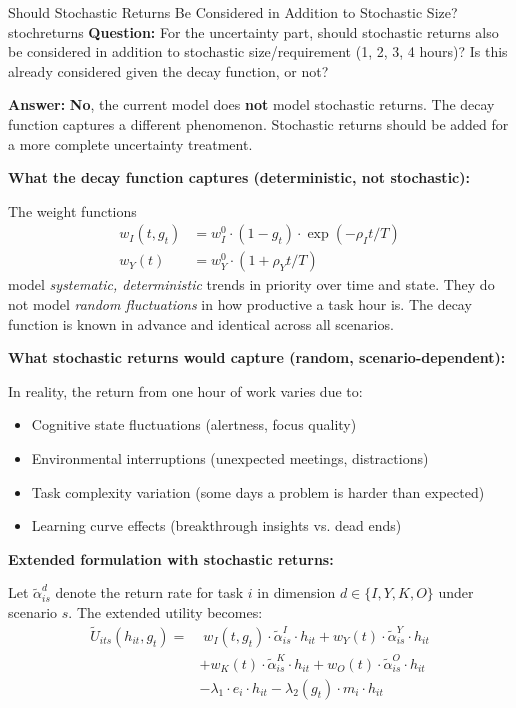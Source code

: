 \documentclass[11pt,a4paper]{article}
\begin{document}
\begin{questionbox}{Should Stochastic Returns Be Considered in Addition to Stochastic Size?}{stochreturns}
\textbf{Question:} For the uncertainty part, should stochastic returns also be considered in addition to stochastic size/requirement (1, 2, 3, 4 hours)? Is this already considered given the decay function, or not?

\textbf{Answer:} \textbf{No}, the current model does \textbf{not} model stochastic returns. The decay function captures a different phenomenon. Stochastic returns should be added for a more complete uncertainty treatment.

\textbf{What the decay function captures (deterministic, not stochastic):}

The weight functions
\begin{align}
w_I(t, g_t) &= w_I^0 \cdot (1 - g_t) \cdot \exp(-\rho_I t/T) \\
w_Y(t) &= w_Y^0 \cdot (1 + \rho_Y t/T)
\end{align}
model \textit{systematic, deterministic} trends in priority over time and state. They do not model \textit{random fluctuations} in how productive a task hour is. The decay function is known in advance and identical across all scenarios.

\textbf{What stochastic returns would capture (random, scenario-dependent):}

In reality, the return from one hour of work varies due to:
\begin{itemize}
    \item Cognitive state fluctuations (alertness, focus quality)
    \item Environmental interruptions (unexpected meetings, distractions)
    \item Task complexity variation (some days a problem is harder than expected)
    \item Learning curve effects (breakthrough insights vs. dead ends)
\end{itemize}

\textbf{Extended formulation with stochastic returns:}

Let $\tilde{\alpha}_{is}^d$ denote the return rate for task $i$ in dimension $d \in \{I, Y, K, O\}$ under scenario $s$. The extended utility becomes:
\begin{align}
\tilde{U}_{its}(h_{it}, g_t) = &\; w_I(t, g_t) \cdot \tilde{\alpha}_{is}^I \cdot h_{it} + w_Y(t) \cdot \tilde{\alpha}_{is}^Y \cdot h_{it} \nonumber \\
&+ w_K(t) \cdot \tilde{\alpha}_{is}^K \cdot h_{it} + w_O(t) \cdot \tilde{\alpha}_{is}^O \cdot h_{it} \nonumber \\
&- \lambda_1 \cdot e_i \cdot h_{it} - \lambda_2(g_t) \cdot m_i \cdot h_{it}
\end{align}


\end{questionbox}
\end{document}
